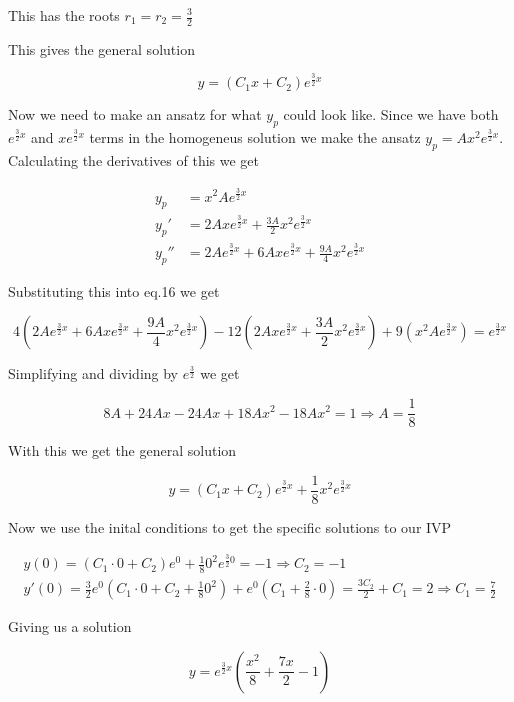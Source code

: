 \documentclass[a4paper]{article}
\begin{document}
This has the roots $r_1 = r_2 = \frac{3}{2}$

This gives the general solution

\begin{equation}
    y = (C_1x + C_2)e^{\frac{3}{2}x}
\end{equation}

Now we need to make an ansatz for what $y_p$ could look like. Since we have both $e^{\frac{3}{2}x}$ and $xe^{\frac{3}{2}x}$ terms in the homogeneus solution we make the ansatz $y_p=Ax^2e^{\frac{3}{2}x}$. Calculating the derivatives of this we get

\begin{align}
    y_p &= x^2Ae^{\frac{3}{2}x}\\
    y_p' &= 2Axe^{\frac{3}{2}x} + \frac{3A}{2}x^2e^{\frac{3}{2}x}\\
    y_p'' &= 2Ae^{\frac{3}{2}x} + 6Axe^{\frac{3}{2}x} + \frac{9A}{4}x^2e^{\frac{3}{2}x}
\end{align}

Substituting this into eq.16 we get

\begin{equation}
    4(2Ae^{\frac{3}{2}x} + 6Axe^{\frac{3}{2}x} + \frac{9A}{4}x^2e^{\frac{3}{2}x}) - 12(2Axe^{\frac{3}{2}x} + \frac{3A}{2}x^2e^{\frac{3}{2}x}) + 9(x^2Ae^{\frac{3}{2}x}) = e^{\frac{3}{2}x}
\end{equation}

Simplifying and dividing by $e^{\frac{3}{2}}$ we get

\begin{equation}
    8A + 24Ax - 24Ax + 18Ax^2 - 18Ax^2 = 1 \Rightarrow A = \frac{1}{8}
\end{equation}

With this we get the general solution

\begin{equation}
    y = (C_1x + C_2)e^{\frac{3}{2}x} + \frac{1}{8}x^2e^{\frac{3}{2}x}
\end{equation}

Now we use the inital conditions to get the specific solutions to our IVP

\begin{align}
    y(0) = (C_1 \cdot 0 + C_2)e^0 + \frac{1}{8}0^2e^{\frac{3}{2}0} = -1 \Rightarrow C_2 = -1\\
    y'(0) = \frac{3}{2}e^0(C_1 \cdot 0 + C_2 + \frac{1}{8}0^2) + e^0(C_1 + \frac{2}{8} \cdot 0) = \frac{3C_2}{2} + C_1 = 2 \Rightarrow C_1 = \frac{7}{2}
\end{align}

Giving us a solution

\begin{equation}
    y = e^{\frac{3}{2}x}(\frac{x^2}{8} + \frac{7x}{2} - 1)
\end{equation}
\end{document}

